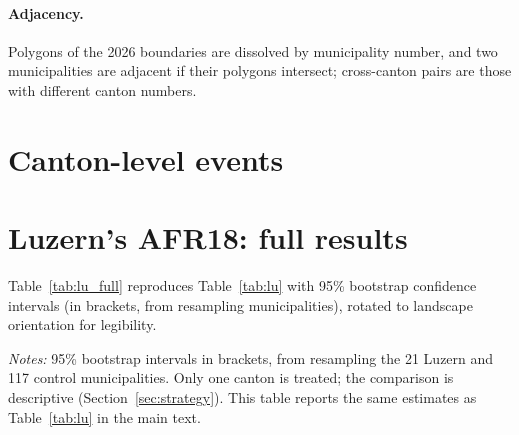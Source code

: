 \documentclass[11pt,a4paper]{article}
\begin{document}
\paragraph{Adjacency.} Polygons of the 2026 boundaries are dissolved by municipality number, and two municipalities are adjacent if their polygons intersect; cross-canton pairs are those with different canton numbers.

\section{Canton-level events}
{\small\setlength{\tabcolsep}{3.3pt}

}

\section{Luzern's AFR18: full results}
Table~\ref{tab:lu_full} reproduces Table~\ref{tab:lu} with 95\% bootstrap confidence intervals (in brackets, from resampling municipalities), rotated to landscape orientation for legibility.

\begin{landscape}
\begin{table}[t]\centering\small
\begin{threeparttable}
\caption{Luzern's AFR18: log gap relative to control cantons and 2019, with 95\% confidence intervals}\label{tab:lu_full}

\begin{tablenotes}\footnotesize
\item \emph{Notes:} 95\% bootstrap intervals in brackets, from resampling the 21 Luzern and 117 control municipalities. Only one canton is treated; the comparison is descriptive (Section~\ref{sec:strategy}). This table reports the same estimates as Table~\ref{tab:lu} in the main text.
\end{tablenotes}
\end{threeparttable}
\end{table}
\end{landscape}
\end{document}
